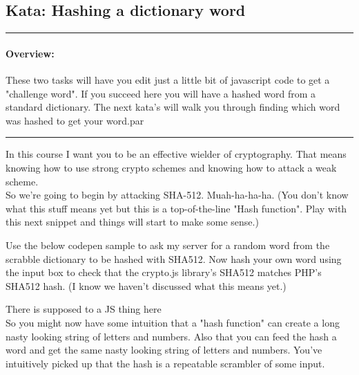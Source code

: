 \documentclass[12pt]{article}
\newenvironment{task}[1][Task:]{ %
    \medskip
    \begin{mdframed}[style=info]
        \noindent{\textbf{#1}}
}{
    \end{mdframed}
}
\newenvironment{overview}
  {\noindent\rule{\textwidth}{0.4pt}
  \paragraph{Overview:}
  }
  {\par
  \noindent\rule{\textwidth}{0.4pt}
  }
\begin{document}
\subsection{Kata: Hashing a dictionary word}

\begin{overview}
These two tasks will have you edit just a little bit of javascript code to get a "challenge word". If you succeed here you will have a hashed word from a standard dictionary. The next kata's will walk you through finding which word was hashed to get your word.par
\end{overview}

In this course I want you to be an effective wielder of cryptography. That means knowing how to use strong crypto schemes and knowing how to attack a weak scheme.\\

So we're going to begin by attacking SHA-512. Muah-ha-ha-ha. (You don't know what this stuff means yet but this is a top-of-the-line "Hash function". Play with this next snippet and things will start to make some sense.)

\begin{task}[CodePen 101 Task:]
Use the below codepen sample to ask my server for a random word from the scrabble dictionary to be hashed with SHA512. Now hash your own word using the input box to check that the crypto.js library's SHA512 matches PHP's SHA512 hash. (I know we haven't discussed what this means yet.)
\end{task}

There is supposed to a JS thing here\\

So you might now have some intuition that a "hash function" can create a long nasty looking string of letters and numbers. Also that you can feed the hash a word and get the same nasty looking string of letters and numbers. You've intuitively picked up that the hash is a repeatable scrambler of some input.

\end{document}
